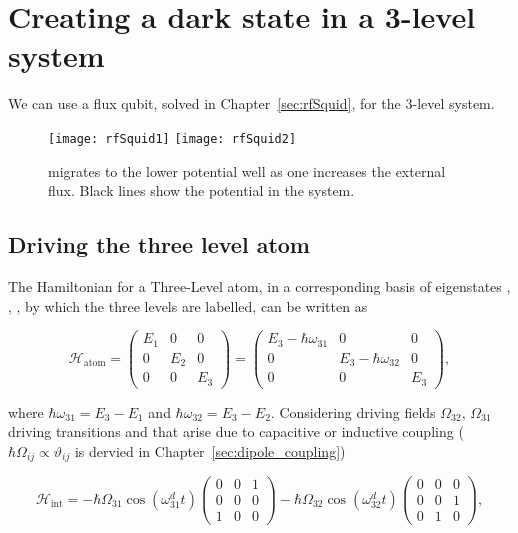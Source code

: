\section{Creating a dark state in a 3-level system\label{sec:dark_state}\cite{sillanpaa2009}\cite{abdumalikov2010}}

We can use a flux qubit, solved in Chapter~\ref{sec:rfSquid}, for the 3-level system.
 
   \begin{figure}[h]
   	\texttt{[image: rfSquid1]} 	\texttt{[image: rfSquid2]}
   	\caption{ migrates to the lower potential well as one increases the external flux. Black lines show the potential in the system.}
   	\label{fig:l3-myone}
   \end{figure}
  
 \subsection{Driving the three level atom\label{subsec:3LevelAtom}}  
  The Hamiltonian for a Three-Level atom, in a corresponding basis of eigenstates , , , by which the three levels are labelled, can be written as
  
  \begin{equation}
  \mathcal{H}_{\text{atom}} = \begin{pmatrix}
  E_1 & 0 & 0\\0& E_2 & 0 \\0&0&E_3
  \end{pmatrix}=\begin{pmatrix}
  E_3-\hbar\omega_{31} & 0 & 0\\0& E_3-\hbar\omega_{32} & 0 \\0&0&E_3
  \end{pmatrix},
  \label{rwaAtomicHamil}
  \end{equation}
  
  \noindent where $ \hbar\omega_{31} = E_3-E_1 $ and $ \hbar\omega_{32} = E_3-E_2$. Considering driving fields $ \Omega_{32} $, $ \Omega_{31} $ driving transitions \lra{} and \lra{} that arise due to capacitive or inductive coupling ($ \hbar\Omega_{ij} \propto \vartheta_{ij} $ is dervied in Chapter~\ref{sec:dipole_coupling})
  
  \begin{equation}
  \mathcal{H}_{\text{int}} = -\hbar\Omega_{31}\cos(\omega_{31}^{d}t) \begin{pmatrix}
  0 & 0 & 1\\0&0&0\\1&0&0
  \end{pmatrix}-\hbar\Omega_{32}\cos(\omega_{32}^{d}t) \begin{pmatrix}
  0 & 0 & 0\\0&0&1\\0&1&0
  \end{pmatrix},
  \label{rwaDriveHamiltonian}
  \end{equation}
  
